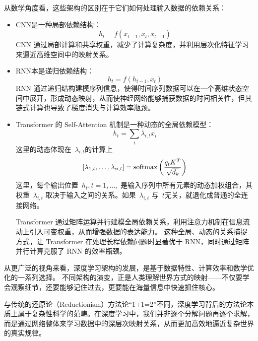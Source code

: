 从数学角度看，这些架构的区别在于它们如何处理输入数据的依赖关系：
\begin{itemize}
\item  CNN是一种局部依赖结构：
$$
h_t = f\left ( x_{t-1},  x_t, x_{t+1} \right)
$$
CNN 通过局部计算和共享权重，减少了计算复杂度，并利用层次化特征学习来逼近高维空间中的映射关系。

\item RNN本是递归依赖结构：
$$
h_t = f\left ( h_{t-1} , x_t \right)
$$
RNN 通过递归结构建模序列信息，使得时间序列数据可以在一个高维状态空间中展开，形成动态映射，从而使神经网络能够捕获数据的时间相关性，但其链式计算也导致了梯度消失与计算效率瓶颈。

\item  Transformer 的 Self-Attention 机制是一种动态的全局依赖模型：
$$
h_t = \sum_{i} \lambda_{i,t} x_i
$$
这里的动态体现在~$\lambda_{i,t}$的计算上
$$
[\lambda_{1,t},\dots, \lambda_{n,t}  ]
 ={\rm softmax} \left( \frac{q_t K^T}{\sqrt{d_k}}\right)
 $$
这里，每个输出位置~$h_t,t=1,\dots,$ 是输入序列中所有元素的动态加权组合，其权重~$\lambda_{i,t}$ 取决于输入之间的关系。如果~$\lambda_{i,t}$ 与~$t$无关，就退化成普通的全连接网络。

Transformer 通过矩阵运算并行建模全局依赖关系，利用注意力机制在信息流动上引入可变权重，从而增强数据的表达能力。
这种全局、动态的关系捕捉方式，让 Transformer 在处理长程依赖问题时显著优于 RNN，同时通过矩阵并行计算克服了 RNN 的效率瓶颈。

\end{itemize}

从更广泛的视角来看，深度学习架构的发展，是基于数据特性、计算效率和数学优化的一系列选择。
不同架构的演变，正是人类理解世界方式的映射——不仅要学会观察细节，还要能够记住过去，更要能在海量信息中快速抓住核心。

与传统的还原论（Reductionism）方法论“1+1=2”不同，深度学习背后的方法论本质上属于复杂性科学的范畴。在深度学习中，我们并非逐个分解问题再逐个求解，而是通过网络整体来学习数据中的深层次映射关系，从而更加高效地逼近复杂世界的真实规律。


